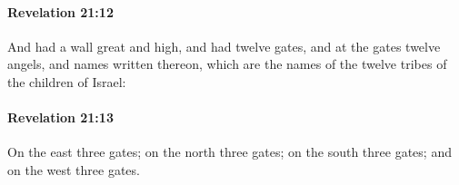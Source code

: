 		\paragraph{Revelation 21:12} %
			\label{REVELATIONNT-21-12}

			And had a wall great and high, and had twelve gates, and at the gates twelve angels, and names written thereon, which are the names of the twelve tribes of the children of Israel:

			\begin{framed}
			\scriptsize
				\begin{compactdesc}
					\item[SBLG] 
				\end{compactdesc}
			\end{framed}

		\paragraph{Revelation 21:13} %
			\label{REVELATIONNT-21-13}

			On the east three gates; on the north three gates; on the south three gates; and on the west three gates.

